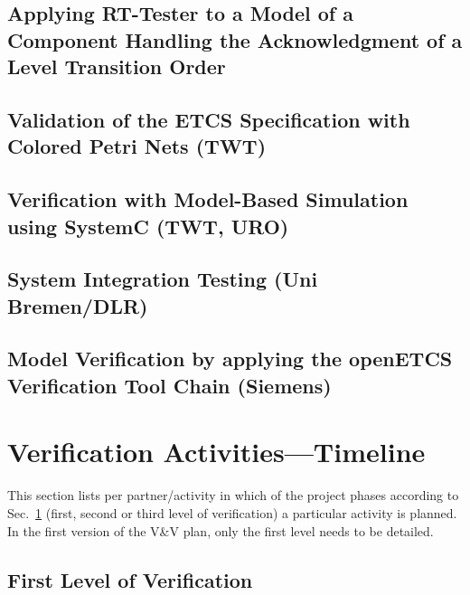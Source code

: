 

\subsection{Applying RT-Tester to a
  Model of a Component Handling the Acknowledgment  of a Level Transition Order }




\subsection{Validation of the ETCS Specification with Colored Petri Nets (TWT)}
\label{sec:VnVUsrStr:TWT}



\subsection{Verification with Model-Based Simulation using SystemC (TWT, URO)}
\label{sec:model-based-sim-openETCS}



\subsection{System Integration  Testing (Uni Bremen/DLR)}



\subsection{Model Verification by applying the openETCS
  Verification Tool Chain (Siemens)}



\section{Verification Activities---Timeline}
\label{sec:verif-activ-timel}

This section lists per partner/activity in which of the project
phases according to Sec.~\ref{sec:verif-activ-timel} (first, second or
third level of verification) a particular activity is planned. In the
first version of the V\&V plan, only the first level needs to be detailed.


\subsection{First Level of Verification}
\label{sec:first-level-verif}

